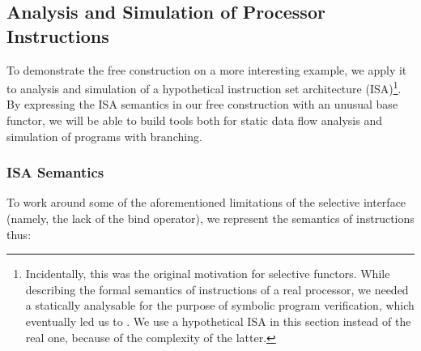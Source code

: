 




\subsection{Analysis and Simulation of Processor Instructions}\label{sec-free-isa}

To demonstrate the free construction on a more interesting example, we apply it
to analysis and simulation of a hypothetical instruction set architecture
(ISA)\footnote{Incidentally, this was the original motivation for selective
functors. While describing the formal semantics of instructions of a real
processor, we needed a statically analysable  for the purpose of
symbolic program verification, which eventually led us to . We use a
hypothetical ISA in this section instead of the real one, because of the
complexity of the latter.}. By expressing the ISA semantics in our
free construction with an unusual base functor, we will be able to build
tools both for static data flow analysis and simulation of programs with
branching.

\vspace{-1mm}
\subsubsection{ISA Semantics}
To work around some of the aforementioned limitations of the selective
interface (namely, the lack of the bind operator), we represent the semantics of
instructions thus:


